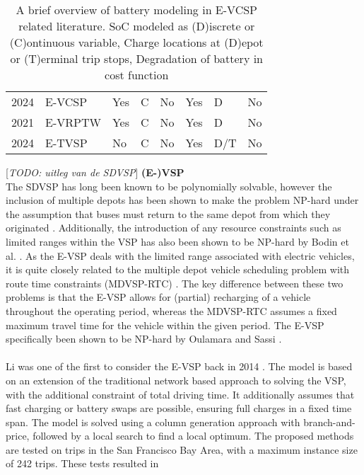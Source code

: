 \documentclass[]{book}
\newcommand{\todo}[1]{{\color{red}[\textit{TODO: #1}]}}
\begin{document}
\begin{table}[]
\begin{tabular}{clllllll}
    \cite{Cong2024} 2024             & E-VCSP  & Yes & C   & No            & Yes         & D            & No          \\
    \addlinespace[0.4em]
    \cite{Ham2021} 2021              & E-VRPTW & Yes & C   & No            & Yes         & D            & No          \\
    \cite{Stadnichuk2024} 2024       & E-TVSP  & No  & C   & No            & Yes         & D/T          & No          \\
    \bottomrule
  \end{tabular}
  \caption{A brief overview of battery modeling in E-VCSP related literature. SoC modeled as (D)iscrete or (C)ontinuous variable, Charge locations at (D)epot or (T)erminal trip stops, Degradation of battery in cost function}
  \label{tab:eVCSP-lit}
\end{table}
\todo{uitleg van de SDVSP}
\noindent \textbf{(E-)VSP} \\
The SDVSP has long been known to be polynomially solvable, however the inclusion of
multiple depots has been shown to make the problem NP-hard under the assumption
that buses must return to the same depot from which they originated
\cite{Bunte2009}. Additionally, the introduction of any resource constraints
such as limited ranges within the VSP has also been shown to be NP-hard by
Bodin et al. \cite{Bodin1983}. As the E-VSP deals with the limited range
associated with electric vehicles, it is quite closely related to the multiple
depot vehicle scheduling problem with route time constraints (MDVSP-RTC)
\cite{Haghani2002}. The key difference between these two problems is that the
E-VSP allows for (partial) recharging of a vehicle throughout the operating
period, whereas the MDVSP-RTC assumes a fixed maximum travel time for the
vehicle within the given period. The E-VSP specifically been shown to be
NP-hard by Oulamara and Sassi \cite{Sassi2014}. \\\\
Li was one of the first to consider the E-VSP back in 2014 \cite{Li2014}. The
model is based on an extension of the traditional network based approach to
solving the VSP, with the additional constraint of total driving time. It
additionally assumes that fast charging or battery swaps are possible, ensuring
full charges in a fixed time span. The model is solved using a column generation
approach with branch-and-price, followed by a local search to find a local
optimum. The proposed methods are tested on trips in the San Francisco Bay
Area, with a maximum instance size of 242 trips. These tests resulted in
\end{document}
